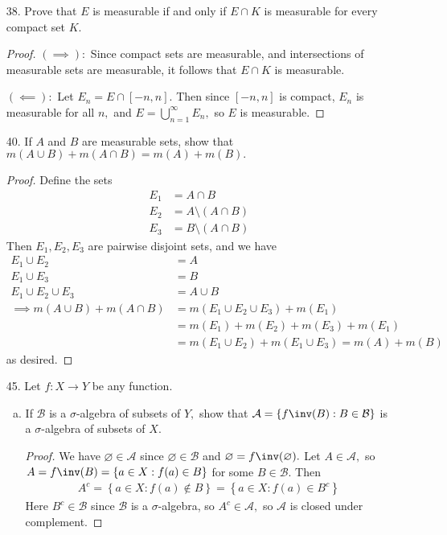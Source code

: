 \documentclass{article}
\begin{document}
\begin{itemize}
	\item[38.] Prove that $E$ is measurable if and only if $E\cap K$ is measurable for every compact set $K.$
		\begin{proof}
			$(\implies):$ Since compact sets are measurable, and intersections of measurable sets are measurable, it follows that $E\cap K$ is measurable.

			$(\impliedby):$ Let $E_n=E\cap [-n, n].$ Then since $[-n, n]$ is compact, $E_n$ is measurable for all $n,$ and $E=\bigcup_{n=1}^\infty E_n,$ so $E$ is measurable.
		\end{proof}

	\item[40.] If $A$ and $B$ are measurable sets, show that $m(A\cup B)+m(A\cap B) = m(A)+m(B).$
		\begin{proof}
			Define the sets
			\begin{align*}
				E_1 &= A\cap B \\
				E_2 &= A\setminus(A\cap B) \\
				E_3 &= B\setminus (A\cap B)
			\end{align*}
			Then $E_1, E_2, E_3$ are pairwise disjoint sets, and we have
			\begin{align*}
				E_1\cup E_2 &= A \\
				E_1\cup E_3 &= B \\
				E_1\cup E_2\cup E_3 &= A\cup B \\
				\implies m(A\cup B) + m(A\cap B) &= m(E_1\cup E_2\cup E_3) + m(E_1) \\
				&= m(E_1) + m(E_2) + m(E_3) + m(E_1) \\
				&= m(E_1\cup E_2) + m(E_1\cup E_3) = m(A) + m(B)
			\end{align*}
			as desired.
		\end{proof}
		
	\item[45.] Let $f:X\to Y$ be any function.
		\begin{enumerate}[(a)]
			\item If $\mathcal B$ is a $\sigma$-algebra of subsets of $Y,$ show that $\mathcal A=\left\{ f\inv(B):B\in\mathcal B \right\}$ is a $\sigma$-algebra of subsets of $X.$
				\begin{proof}
					We have $\varnothing\in\mathcal A$ since $\varnothing\in \mathcal B$ and $\varnothing=f\inv(\varnothing).$ Let $A\in\mathcal A,$ so $A=f\inv(B)=\left\{ a\in X:f(a)\in B \right\}$ for some $B\in\mathcal B.$ Then
					\begin{align*}
						A^c = \left\{ a\in X:f(a)\not\in B \right\} = \left\{ a\in X:f(a)\in B^c \right\}
					\end{align*}
					Here $B^c\in \mathcal B$ since $\mathcal B$ is a $\sigma$-algebra, so $A^c\in \mathcal A,$ so $\mathcal A$ is closed under complement.


\end{proof}
\end{enumerate}
\end{itemize}
\end{document}
